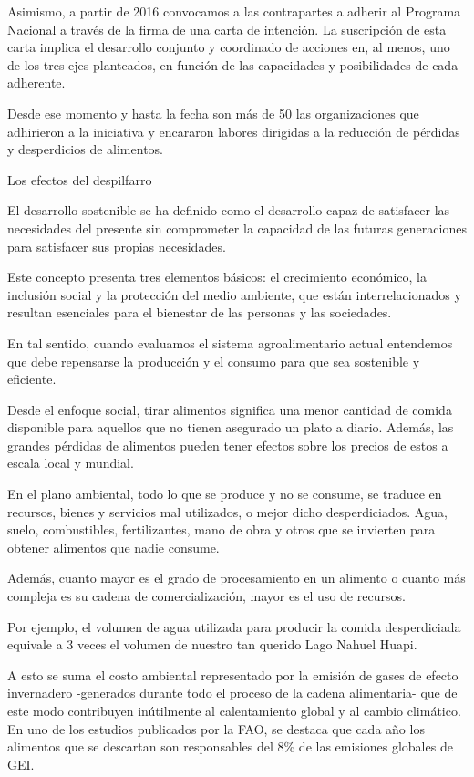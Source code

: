 Asimismo, a partir de 2016 convocamos a las contrapartes a adherir al
Programa Nacional a través de la firma de una carta de intención. La
suscripción de esta carta implica el desarrollo conjunto y coordinado de
acciones en, al menos, uno de los tres ejes planteados, en función de
las capacidades y posibilidades de cada adherente.

Desde ese momento y hasta la fecha son más de 50 las organizaciones que
adhirieron a la iniciativa y encararon labores dirigidas a la reducción
de pérdidas y desperdicios de alimentos.

Los efectos del despilfarro

El desarrollo sostenible se ha definido como el desarrollo capaz de
satisfacer las necesidades del presente sin comprometer la capacidad de
las futuras generaciones para satisfacer sus propias necesidades.

Este concepto presenta tres elementos básicos: el crecimiento económico,
la inclusión social y la protección del medio ambiente, que están
interrelacionados y resultan esenciales para el bienestar de las
personas y las sociedades.

En tal sentido, cuando evaluamos el sistema agroalimentario actual
entendemos que debe repensarse la producción y el consumo para que sea
sostenible y eficiente.

Desde el enfoque social, tirar alimentos significa una menor cantidad de
comida disponible para aquellos que no tienen asegurado un plato a
diario. Además, las grandes pérdidas de alimentos pueden tener efectos
sobre los precios de estos a escala local y mundial.

En el plano ambiental, todo lo que se produce y no se consume, se
traduce en recursos, bienes y servicios mal utilizados, o mejor dicho
desperdiciados. Agua, suelo, combustibles, fertilizantes, mano de obra y
otros que se invierten para obtener alimentos que nadie consume.

Además, cuanto mayor es el grado de procesamiento en un alimento o
cuanto más compleja es su cadena de comercialización, mayor es el uso de
recursos.

Por ejemplo, el volumen de agua utilizada para producir la comida
desperdiciada equivale a 3 veces el volumen de nuestro tan querido Lago
Nahuel Huapi.

A esto se suma el costo ambiental representado por la emisión de gases
de efecto invernadero -generados durante todo el proceso de la cadena
alimentaria- que de este modo contribuyen inútilmente al calentamiento
global y al cambio climático. En uno de los estudios publicados por la
FAO, se destaca que cada año los alimentos que se descartan son
responsables del 8\% de las emisiones globales de GEI.

